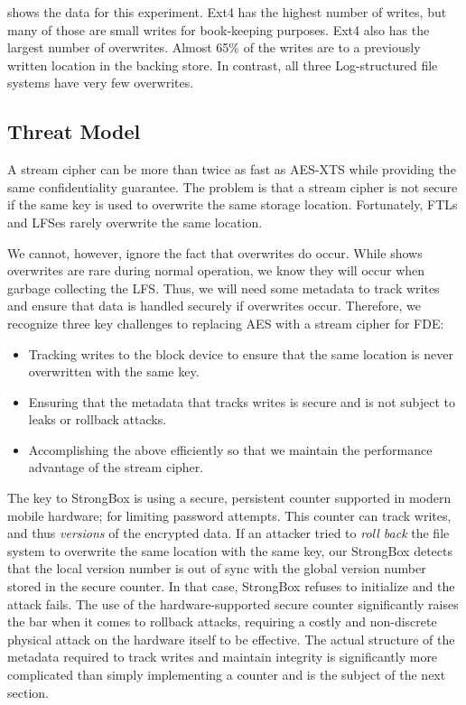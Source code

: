  shows the data for this experiment. Ext4 has the highest
number of writes, but many of those are small writes for book-keeping purposes.
Ext4 also has the largest number of overwrites. Almost 65\% of the writes are to
a previously written location in the backing store. In contrast, all three
Log-structured file systems have very few overwrites.

\subsection{Threat Model}

A stream cipher can be more than twice as fast as AES-XTS while providing the
same confidentiality guarantee. The problem is that a stream cipher is not
secure if the same key is used to overwrite the same storage location.
Fortunately, FTLs and LFSes rarely overwrite the same location.

We cannot, however, ignore the fact that overwrites do occur. While
 shows overwrites are rare during normal operation, we know
they will occur when garbage collecting the LFS. Thus, we will need some
metadata to track writes and ensure that data is handled securely if overwrites
occur. Therefore, we recognize three key challenges to replacing AES with a
stream cipher for FDE:

\begin{itemize}

\item Tracking writes to the block device to ensure that the same location is
never overwritten with the same key.

\item Ensuring that the metadata that tracks writes is secure and is not
subject to leaks or rollback attacks.

\item Accomplishing the above efficiently so that we maintain the  performance
advantage of the stream cipher.

\end{itemize}

The key to StrongBox is using a secure, persistent counter supported in modern
mobile hardware; \eg for limiting password attempts. This counter can track
writes, and thus \emph{versions} of the encrypted data. If an attacker tried to
\emph{roll back} the file system to overwrite the same location with the same
key, our StrongBox detects that the local version number is out of sync with the
global version number stored in the secure counter. In that case, StrongBox
refuses to initialize and the attack fails. The use of the hardware-supported
secure counter significantly raises the bar when it comes to rollback attacks,
requiring a costly and non-discrete physical attack on the hardware itself to be
effective. The actual structure of the metadata required to track writes and
maintain integrity is significantly more complicated than simply implementing a
counter and is the subject of the next section.

